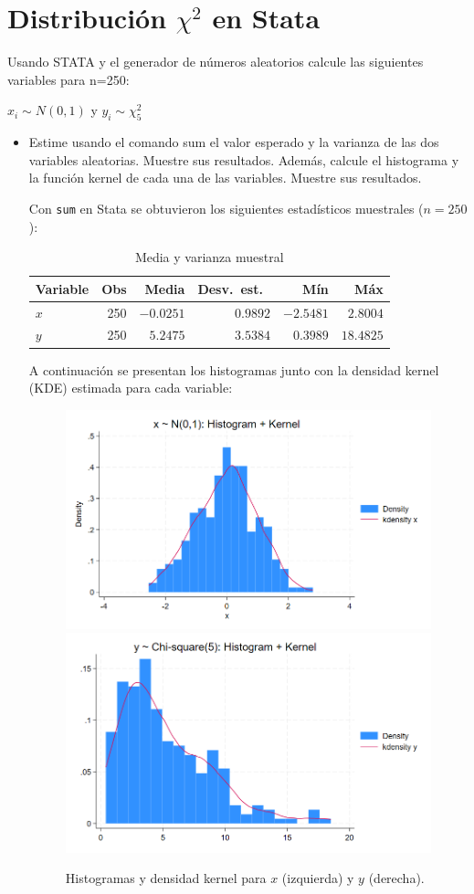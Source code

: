 \documentclass[12pt]{article}
\begin{document}
\section{Distribución $\chi^2$ en Stata}

Usando STATA y el generador de números aleatorios calcule las siguientes variables para n=250: 

$x_i \sim N(0,1)$ y $y_i \sim \chi_5^2$

\begin{itemize}
    \item Estime usando el comando sum el valor esperado y la varianza de las dos variables aleatorias. Muestre sus resultados. Además, calcule el histograma y la función kernel de cada una de las variables. Muestre sus resultados.

    Con \texttt{sum} en Stata se obtuvieron los siguientes estadísticos muestrales (\(n=250\)):

    \begin{table}[h!]
    \centering
    \caption{Media y varianza muestral}
    \begin{tabular}{lrrrrr}
    \hline
    Variable & Obs & Media & Desv.\ est.\ & Mín & Máx \\
    \hline
    $x$ & 250 & $-0.0251$ & $0.9892$ & $-2.5481$ & $2.8004$ \\
    $y$ & 250 & $5.2475$  & $3.5384$ & $0.3989$  & $18.4825$ \\
    \hline
    \end{tabular}
    \end{table}
    
    \vspace{0.5em}
    A continuación se presentan los histogramas junto con la densidad kernel (KDE) estimada para cada variable:
    
    \begin{figure}[h!]
    \centering
    \includegraphics[width=.48\textwidth]{Figures/0110_hist_x.png}\hfill
    \includegraphics[width=.48\textwidth]{Figures/0110_hist_y.png}
    \caption{Histogramas y densidad kernel para $x$ (izquierda) y $y$ (derecha).}
    \end{figure}


\end{itemize}
\end{document}
